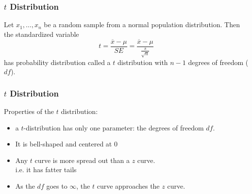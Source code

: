 \documentclass[handout]{beamer}
\newcommand{\blue}[1]{\textcolor{blue2}{#1}}
\begin{document}
\begin{frame}
\frametitle{$t$ Distribution}

Let $x_1,\ldots,x_n$ be a random sample from a \blue{normal} population distribution.  \pause Then the standardized variable 
\[
t = \frac{\overline{x}-\mu}{SE} = \frac{\overline{x}-\mu}{\frac{s}{\sqrt n}}
\]
has probability distribution called a \blue{$t$ distribution with $n-1$ degrees of freedom ($df$)}.

\end{frame}


\begin{frame}
\frametitle{$t$ Distribution}
Properties of the $t$ distribution:

\begin{itemize}
\item a $t$-distribution has only one parameter: the \blue{degrees of freedom} $df$.
\pause \item It is bell-shaped and centered at 0
\pause \item Any $t$ curve is more spread out than a $z$ curve.\\
i.e. it has \blue{fatter tails}
\pause \item As the $df$ goes to $\infty$, the $t$ curve approaches the $z$ curve.
\end{itemize}

\end{frame}
\end{document}
